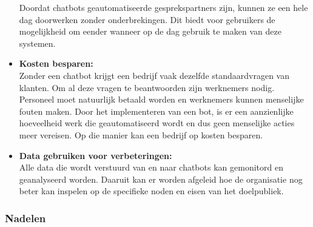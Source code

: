 \begin{itemize}
    Doordat chatbots geautomatiseerde gesprekspartners zijn, kunnen ze een hele dag doorwerken zonder onderbrekingen. Dit biedt voor gebruikers de mogelijkheid om eender wanneer op de dag gebruik te maken van deze systemen. \\
    
    \item \textbf{Kosten besparen:} \\
    
    Zonder een chatbot krijgt een bedrijf vaak dezelfde standaardvragen van klanten. Om al deze vragen te beantwoorden zijn werknemers nodig. Personeel moet natuurlijk betaald worden en werknemers kunnen menselijke fouten maken. Door het implementeren van een bot, is er een aanzienlijke hoeveelheid werk die geautomatiseerd wordt en dus geen menselijke acties meer vereisen. Op die manier kan een bedrijf op kosten besparen. \\
    
    \item \textbf{Data gebruiken voor verbeteringen:} \\
    
    Alle data die wordt verstuurd van en naar chatbots kan gemonitord en geanalyseerd worden. Daaruit kan er worden afgeleid hoe de organisatie nog beter kan inspelen op de specifieke noden en eisen van het doelpubliek. \\ 
    
\end{itemize}

\subsubsection{Nadelen}
\label{subsubsec:chatbots-voor-en-nadelen-nadelen}

